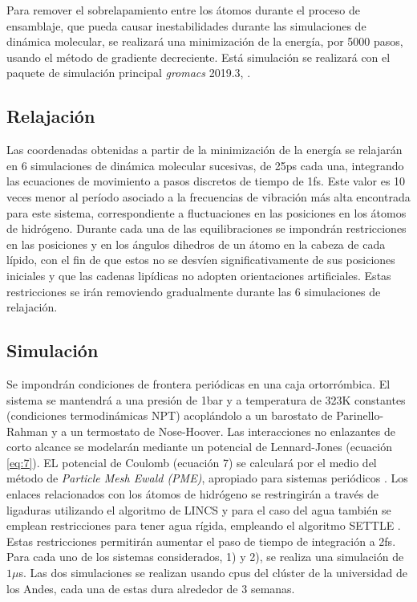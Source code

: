 Para remover el sobrelapamiento entre los \'{a}tomos durante el proceso de ensamblaje, que pueda causar inestabilidades durante las simulaciones de din\'{a}mica molecular, se realizar\'{a} una minimizaci\'{o}n de la energ\'{i}a, por 5000 pasos, usando el m\'{e}todo de gradiente decreciente. Est\'{a} simulaci\'{o}n se realizar\'{a} con el paquete de simulaci\'{o}n principal \textit{gromacs} 2019.3, \cite{Abraham2015Gromacs:Supercomputers}.


\subsection*{Relajaci\'{o}n}

Las coordenadas obtenidas a partir de la minimizaci\'{o}n de la energ\'{i}a se relajar\'{a}n en 6 simulaciones de din\'{a}mica molecular sucesivas, de 25ps cada una, integrando las ecuaciones de movimiento a pasos discretos de tiempo de 1fs. Este valor es 10 veces menor al per\'{i}odo asociado a la frecuencias de vibraci\'{o}n m\'{a}s alta encontrada para este sistema, correspondiente a fluctuaciones en las posiciones en los \'{a}tomos de hidr\'{o}geno. Durante cada una de las equilibraciones se impondr\'{a}n restricciones en las posiciones y en los \'{a}ngulos dihedros de un \'{a}tomo en la cabeza de cada l\'{i}pido, con el fin de que estos no se desv\'{i}en significativamente de sus posiciones iniciales y que las cadenas lip\'{i}dicas no adopten orientaciones artificiales. Estas restricciones se ir\'{a}n removiendo gradualmente durante las 6 simulaciones de relajaci\'{o}n.\\

\subsection*{Simulaci\'{o}n}

Se impondr\'{a}n condiciones de frontera peri\'{o}dicas en una caja ortorr\'{o}mbica. El sistema se mantendr\'{a} a una presi\'{o}n de 1bar y a temperatura de 323K constantes (condiciones termodin\'{a}micas NPT) acopl\'{a}ndolo a un barostato de Parinello-Rahman \cite{Parrinello1981PolymorphicMethod} y a un termostato de Nose-Hoover. Las interacciones no enlazantes de corto alcance se modelar\'{a}n mediante un potencial de Lennard-Jones (ecuaci\'{o}n \eqref{eq:7}). EL potencial de Coulomb (ecuaci\'{o}n 7) se calcular\'{a} por el medio del m\'{e}todo de \textit{Particle Mesh Ewald (PME)}, apropiado para sistemas peri\'{o}dicos \cite{Darden1993ParticleSystems}. Los enlaces relacionados con los \'{a}tomos de hidr\'{o}geno  se restringir\'{a}n a trav\'{e}s de ligaduras utilizando el algoritmo de LINCS \cite{Hess1997LINCS:Simulations} y para el caso del agua tambi\'{e}n se emplean restricciones para tener agua r\'{i}gida, empleando el algoritmo SETTLE \cite{Miyamoto1992Settle:Models}. Estas restricciones permitir\'{a}n aumentar el paso de tiempo de integraci\'{o}n a 2fs. Para cada uno de los sistemas considerados, 1) y 2), se realiza una simulaci\'{o}n de $1\mu$s. Las dos simulaciones se realizan usando cpus del cl\'{u}ster de la universidad de los Andes, cada una de estas dura alrededor de 3 semanas.\\


